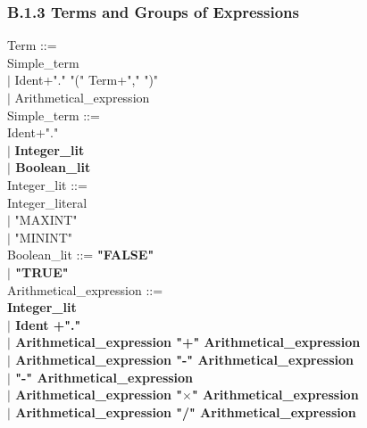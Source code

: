 \documentclass[12pt,a4paper,draft]{article}
\begin{document}
{\begin{sloppypar}
\subsubsection{B.1.3 Terms and Groups of Expressions}
\noindent Term  ::= \\
   Simple\_term\\
\hspace*{0.20in} $|$ Ident+"." "(" Term+"," ")"  \\
\hspace*{0.20in} $|$  Arithmetical\_expression\\
Simple\_term ::= \\
  Ident+"."\\
  \hspace*{0.20in} $|$ \textbf{ Integer\_lit\\
\hspace*{0.20in} $|$  Boolean\_lit}\\
Integer\_lit ::= \\
\hspace*{0.20in} Integer\_literal \\
\hspace*{0.20in} $|$ "MAXINT"\\
\hspace*{0.20in} $|$ "MININT" \\
Boolean\_lit ::= \textbf{"FALSE"\\
\hspace*{0.20in} $|$ "TRUE"} \\
Arithmetical\_expression ::= \\
\hspace*{0.20in}  \textbf{ Integer\_lit\\
\hspace*{0.20in} $|$  Ident +"."\\
\hspace*{0.20in} $|$  Arithmetical\_expression  "+"  Arithmetical\_expression\\
\hspace*{0.20in} $|$  Arithmetical\_expression  "-"  Arithmetical\_expression\\
\hspace*{0.20in} $|$ "-" Arithmetical\_expression \\
\hspace*{0.20in} $|$  Arithmetical\_expression  "$\times$"  Arithmetical\_expression\\
\hspace*{0.20in} $|$  Arithmetical\_expression  "/"  Arithmetical\_expression\\
}
\end{sloppypar}}
\end{document}
